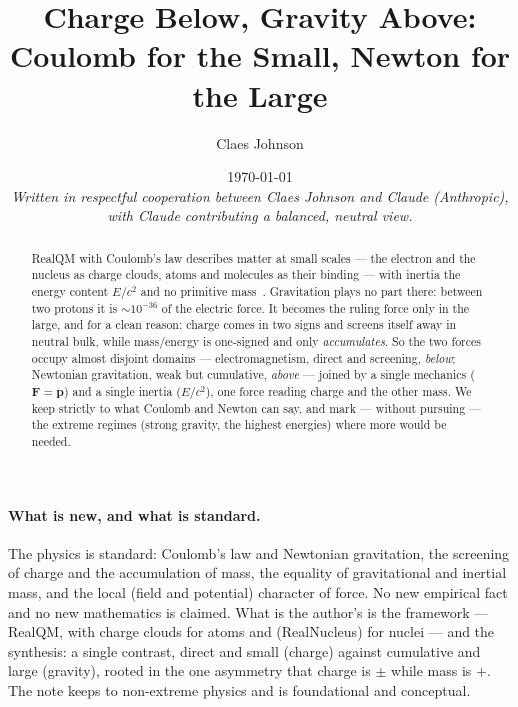 \documentclass[11pt]{article}
\title{Charge Below, Gravity Above:\\[0.2em]
\large Coulomb for the Small, Newton for the Large}
\author[1]{Claes Johnson}
\affil[1]{KTH Royal Institute of Technology, SE-100 44 Stockholm, Sweden \\
\texttt{claesjohnson@gmail.com}}
\date{\today \\[0.5em]
\small\textit{Written in respectful cooperation between Claes Johnson and Claude (Anthropic), with Claude
contributing a balanced, neutral view.}}
\begin{document}
\maketitle

\begin{abstract}
RealQM with Coulomb's law describes matter at small scales --- the electron and the nucleus as charge clouds, atoms
and molecules as their binding --- with inertia the energy content $E/c^2$ and no primitive mass~\cite{NoMass}.
Gravitation plays no part there: between two protons it is $\sim10^{-36}$ of the electric force. It becomes the
ruling force only in the large, and for a clean reason: charge comes in two signs and screens itself away in
neutral bulk, while mass/energy is one-signed and only \emph{accumulates}. So the two forces occupy almost disjoint
domains --- electromagnetism, direct and screening, \emph{below}; Newtonian gravitation, weak but cumulative,
\emph{above} --- joined by a single mechanics ($\mathbf F=\dot{\mathbf p}$) and a single inertia ($E/c^2$), one
force reading charge and the other mass. We keep strictly to what Coulomb and Newton can say, and mark --- without
pursuing --- the extreme regimes (strong gravity, the highest energies) where more would be needed.
\end{abstract}


\paragraph{What is new, and what is standard.} The physics is standard: Coulomb's law and Newtonian gravitation,
the screening of charge and the accumulation of mass, the equality of gravitational and inertial mass, and the
local (field and potential) character of force. No new empirical fact and no new mathematics is claimed. What is
the author's is the framework --- RealQM, with charge clouds for atoms and (RealNucleus) for nuclei --- and the
synthesis: a single contrast, direct and small (charge) against cumulative and large (gravity), rooted in the one
asymmetry that charge is $\pm$ while mass is $+$. The note keeps to non-extreme physics and is foundational and
conceptual.
\end{document}
